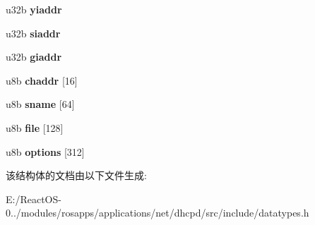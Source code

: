 \begin{DoxyCompactItemize}
u32b {\bfseries yiaddr}
\item 
\mbox{\label{struct_d_h_c_p_m_e_s_s_a_g_e_a60bd2bf672c0017c5fa2ec95325140e2}} 
u32b {\bfseries siaddr}
\item 
\mbox{\label{struct_d_h_c_p_m_e_s_s_a_g_e_af4302985a7d46141ea30895de06f32e9}} 
u32b {\bfseries giaddr}
\item 
\mbox{\label{struct_d_h_c_p_m_e_s_s_a_g_e_ac9768c926f790b787d8f179e4ddce731}} 
u8b {\bfseries chaddr} \mbox{[}16\mbox{]}
\item 
\mbox{\label{struct_d_h_c_p_m_e_s_s_a_g_e_a7514d9a144d2915a8678ea7a45f0b32b}} 
u8b {\bfseries sname} \mbox{[}64\mbox{]}
\item 
\mbox{\label{struct_d_h_c_p_m_e_s_s_a_g_e_acd04996f5c702e8ceec8f71e085b3993}} 
u8b {\bfseries file} \mbox{[}128\mbox{]}
\item 
\mbox{\label{struct_d_h_c_p_m_e_s_s_a_g_e_a865e6bb86f9cc581f05db4ff9bee83e8}} 
u8b {\bfseries options} \mbox{[}312\mbox{]}
\end{DoxyCompactItemize}


该结构体的文档由以下文件生成\+:\begin{DoxyCompactItemize}
\item 
E\+:/\+React\+O\+S-\/0../modules/rosapps/applications/net/dhcpd/src/include/datatypes.\+h\end{DoxyCompactItemize}
